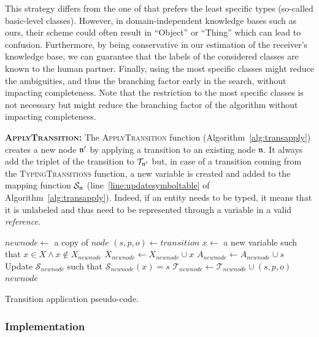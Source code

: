 \documentclass[a4paper,11pt,twoside]{StyleThese}
\begin{document}
This strategy differs from the one of \cite{dale1995computational} that prefers the least specific types (so-called basic-level classes).
However, in domain-independent knowledge bases such as ours, their scheme could often result in ``Object'' or ``Thing'' which can lead to confusion.
Furthermore, by being conservative in our estimation of the receiver's knowledge base, we can guarantee that the labels of the considered classes are known to the human partner.
Finally, using the most specific classes might reduce the ambiguities, and thus the branching factor early in the search, without impacting completeness.
Note that the restriction to the most specific classes is not necessary but might reduce the branching factor of the algorithm without impacting completeness.

\textbf{\textsc{ApplyTransition}:}
The \textsc{ApplyTransition} function (Algorithm~\ref{alg:transapply}) creates a new node $\mathfrak{n}'$ by applying a transition to an existing node $\mathfrak{n}$. It always add the triplet of the transition to $\mathcal{T}_{\mathfrak{n}'}$ but, in case of a transition coming from the \textsc{TypingTransitions} function, a new variable is created and added to the mapping function $\mathcal{S}_{\mathfrak{n}}$ (line~\ref{line:updatesymboltable} of Algorithm~\ref{alg:transapply}). Indeed, if an entity needs to be typed, it means that it is unlabeled and thus need to be represented through a variable in a valid \textit{reference}.

\begin{algorithm}[htb]
\begin{algorithmic}[1]
\State $newnode \leftarrow$ a copy of $node$
\State $(s, p, o) \leftarrow transition$
	\State $x \leftarrow$ a new variable such that $x \in X \land x \notin X_{newnode}$
	\State $X_{newnode} \leftarrow X_{newnode} \cup x$
	\State $A_{newnode} \leftarrow A_{newnode} \cup s$
	\State Update $\mathcal{S}_{newnode}$ such that $\mathcal{S}_{newnode}(x) = s$ \label{line:updatesymboltable}
\EndIf
\State $\mathcal{T}_{newnode} \leftarrow \mathcal{T}_{newnode} \cup (s, p, o)$
\State \Return $newnode$
\EndFunction
\end{algorithmic}
 \caption{Transition application pseudo-code.}
 \label{alg:transapply}
\end{algorithm}



\subsubsection{Implementation}
\end{document}

